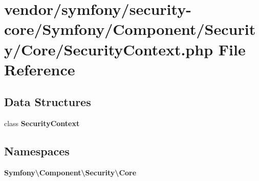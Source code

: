 \section{vendor/symfony/security-\/core/\+Symfony/\+Component/\+Security/\+Core/\+Security\+Context.php File Reference}
\label{_security_context_8php}
\subsection*{Data Structures}
\begin{DoxyCompactItemize}
\item 
class {\bf Security\+Context}
\end{DoxyCompactItemize}
\subsection*{Namespaces}
\begin{DoxyCompactItemize}
\item 
 {\bf Symfony\textbackslash{}\+Component\textbackslash{}\+Security\textbackslash{}\+Core}
\end{DoxyCompactItemize}
